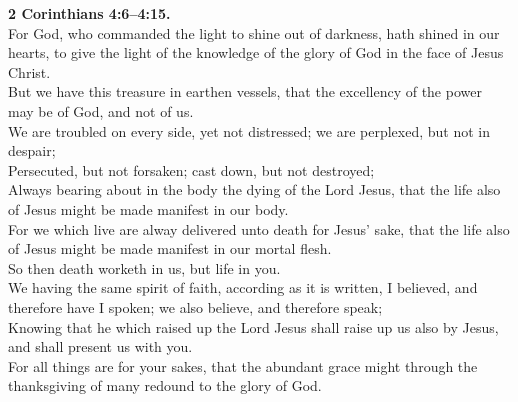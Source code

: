 \documentclass[10pt]{article} %
\begin{document}
{\begin{minipage}[t]{0.45\textwidth}
\textbf{2 Corinthians 4:6--4:15.}\\
For God, who commanded the light to shine out of darkness, hath shined in our hearts, to give the light of the knowledge of the glory of God in the face of Jesus Christ.\\
But we have this treasure in earthen vessels, that the excellency of the power may be of God, and not of us.\\
We are troubled on every side, yet not distressed; we are perplexed, but not in despair;\\
Persecuted, but not forsaken; cast down, but not destroyed;\\
Always bearing about in the body the dying of the Lord Jesus, that the life also of Jesus might be made manifest in our body.\\
For we which live are alway delivered unto death for Jesus' sake, that the life also of Jesus might be made manifest in our mortal flesh.\\
So then death worketh in us, but life in you.\\
We having the same spirit of faith, according as it is written, I believed, and therefore have I spoken; we also believe, and therefore speak;\\
Knowing that he which raised up the Lord Jesus shall raise up us also by Jesus, and shall present us with you.\\
For all things are for your sakes, that the abundant grace might through the thanksgiving of many redound to the glory of God.\\

\end{minipage}}
\vspace*{\fill}
\newpage
\Huge%
\vspace*{\fill}
\end{document}
